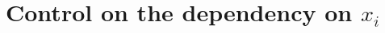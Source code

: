 \documentclass[a4papaer, titlepage]{book}
\begin{document}
 \section{Control on the dependency on $x_i$}\label{app:borne_Qx_i_Qy_i}
   
\end{document}
